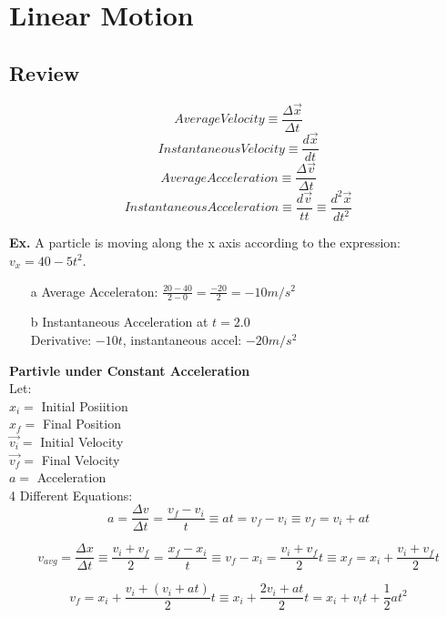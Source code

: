 \documentclass[]{article}
\date{}
\title{\docTitle}
\author{\docAuthor}
\date{\today}
\begin{document}
\maketitle
\section*{Linear Motion}
\subsection*{Review}
$$Average Velocity \equiv \frac{\Delta \vec{x}}{\Delta t}$$
$$Instantaneous Velocity \equiv \frac{d \vec{x}}{d t}$$
$$Average Acceleration \equiv \frac{\Delta \vec{v}}{\Delta t}$$
$$Instantaneous Acceleration \equiv \frac{d \vec{v}}{t t} \equiv \frac{d^2\vec{x}}{dt^2}$$

\textbf{Ex.} A particle is moving along the x axis according to the expression: $v_x=40-5t^2$.
\begin{enumerate}
    \item[a] Average Acceleraton: $\frac{20-40}{2-0} = \frac{-20}{2} = -10m/s^2$
    \item[b] Instantaneous Acceleration at $t = 2.0$\\ Derivative: $-10t$, instantaneous accel: $-20m/s^2$
\end{enumerate}

\textbf{Partivle under Constant Acceleration}\\
Let:\\
$x_i = $ Initial Posiition\\
$x_f = $ Final Position\\
$\vec{v_i} = $ Initial Velocity\\
$\vec{v_f} = $ Final Velocity\\
$a = $ Acceleration \\
4 Different Equations:
\begin{equation*}
    a = \frac{\Delta v}{\Delta t} = \frac{v_f-v_i}{t} \equiv at = v_f-v_i \equiv v_f=v_i+at
\end{equation*}

\begin{equation*}
    v_{avg} = \frac{\Delta x}{\Delta t} \equiv \frac{v_i + v_f}{2} = \frac{x_f-x_i}{t} \equiv v_f-x_i = \frac{v_i+v_f}{2}t \equiv x_f = x_i+\frac{v_i+v_f}{2}t
\end{equation*}

\begin{equation*}
    v_f = x_i+\frac{v_i+(v_i+at)}{2}t \equiv x_i + \frac{2v_i+at}{2}t = x_i+v_it+\frac{1}{2}at^2
\end{equation*}
\end{document}
